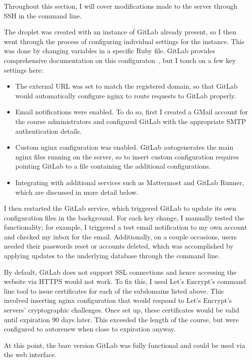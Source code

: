 \documentclass[12pt,twoside]{mitthesis}
\newcommand{\draft}[1]{{\color{blue} #1}}
\begin{document}
\draft{Throughout this section, I will cover modifications made to the server through SSH in the command line.

The droplet was created with an instance of GitLab already present, so I then went through the process of configuring individual settings for the instance. This was done by changing variables in a specific Ruby file. GitLab provides comprehensive documentation on this configuraton~\cite{gitlabdocs}, but I touch on a few key settings here:
\begin{itemize}
\item The external URL was set to match the registered domain, so that GitLab would automatically configure nginx to route requests to GitLab properly.
\item Email notifications were enabled. To do so, first I created a GMail account for the course administrators and configured GitLab with the appropriate SMTP authentication details. 
\item Custom nginx configuration was enabled. GitLab autogenerates the main nginx files running on the server, so to insert custom configuration requires pointing GitLab to a file containing the additional configurations.
\item Integrating with additional services such as Mattermost and GitLab Runner, which are discussed in more detail below.
\end{itemize}
I then restarted the GitLab service, which triggered GitLab to update its own configuration files in the background. For each key change, I manually tested the functionality; for example, I triggered a test email notification to my own account and checked my inbox for the email. Additionally, on a couple occasions, users needed their passwords reset or accounts deleted, which was accomplished by applying updates to the underlying database through the command line.

By default, GitLab does not support SSL connections and hence accessing the website via HTTPS would not work. To fix this, I used Let's Encrypt's command line tool to issue certificates for each of the subdomains listed above. This involved inserting nginx configuration that would respond to Let's Encrypt's servers' cryptographic challenges. Once set up, these certificates would be valid until expiration 90 days later. This exceeded the length of the course, but were configured to autorenew when close to expiration anyway. 

At this point, the bare version GitLab was fully functional and could be used via the web interface.

}
\end{document}
